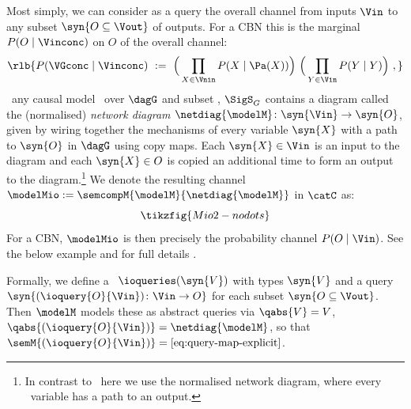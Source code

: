 \documentclass{article}
\begin{document}
Most simply, we can consider as a query the overall channel from inputs $\Vin$ to any subset $\syn{O \subseteq \Vout}$ of outputs. For a CBN this is the marginal $P(O \mid \Vinconc)$ on $O$ of the overall channel: 
\begin{align}
\rlb{P(\VGconc \mid \Vinconc) \ := \ \Big( \prod_{X \in \Vnin} P(X \mid \Pa(X)) \Big) \ \Big( \prod_{Y \in \Vin} P(Y \mid Y) \Big) \ , } \label{eq:CBN-io-channel}
\end{align}
\ 
any causal model \rl{$\modelM$}\ over $\dagG$ and subset , $\SigS_G$ contains a diagram called the (normalised) \emph{network diagram} $\netdiag{\modelM} \colon \syn{\Vin} \to \syn{O}$, 
given by wiring together the mechanisms of every variable $\syn{X}$ with a path to $\syn{O}$ in $\dagG$ using copy maps. Each $\syn{X} \in \Vin$ is an input to the diagram and each $\syn{X} \in O$ is copied an additional time to form an output to the diagram.\footnote{In contrast to~\cite{lorenz2023causal} here we use the normalised network diagram, where every \  variable has a path to an output. 
}   
We denote the resulting channel $\modelMio := \semcompM{\modelM}{\netdiag{\modelM}}$ in $\catC$ as:
\begin{equation} \label{eq:query-map-explicit}
\tikzfig{Mio2-nodots} %
\end{equation} 
For a CBN, $\modelMio$ is then precisely the probability channel $P(O \mid \Vin)$. See the below example and for full details .

Formally, we define a \ $\ioqueries(\syn{V})$ with types $\syn{V}$ and a query $\syn{(\ioquery{O}{\Vin}) \colon \Vin \to O}$ for each subset $\syn{O \subseteq \Vout}$. Then $\modelM$ models these as abstract queries via  
$\qabs{V} = V$,  $\qabs{(\ioquery{O}{\Vin})} = \netdiag{\modelM}$,    
so that $\semM{(\ioquery{O}{\Vin})} = \eqref{eq:query-map-explicit}$. 
\end{document}
